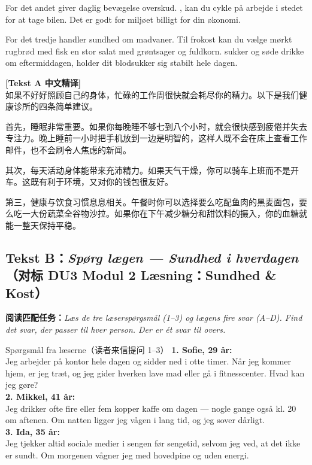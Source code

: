 For det andet giver daglig bevægelse overskud. , kan du cykle på arbejde i stedet for at tage bilen. Det er  godt for miljøet  billigt for din økonomi.

For det tredje handler sundhed om madvaner. Til frokost kan du vælge  mørkt rugbrød med fisk  en stor salat med grøntsager og fuldkorn.  sukker og søde drikke om eftermiddagen, holder dit blodsukker sig stabilt hele dagen.

\begin{transbox}
\small
\textbf{\color{NCDTeal}[Tekst A 中文精译]}\\
如果不好好照顾自己的身体，忙碌的工作周很快就会耗尽你的精力。以下是我们健康诊所的四条简单建议。

首先，睡眠非常重要。如果你每晚睡不够七到八个小时，就会很快感到疲倦并失去专注力。晚上睡前一小时把手机放到一边是明智的，这样人既不会在床上查看工作邮件，也不会刷令人焦虑的新闻。

其次，每天活动身体能带来充沛精力。如果天气干燥，你可以骑车上班而不是开车。这既有利于环境，又对你的钱包很友好。

第三，健康与饮食习惯息息相关。午餐时你可以选择要么吃配鱼肉的黑麦面包，要么吃一大份蔬菜全谷物沙拉。如果你在下午减少糖分和甜饮料的摄入，你的血糖就能一整天保持平稳。
\end{transbox}

\subsection*{Tekst B：\textit{Spørg lægen --- Sundhed i hverdagen}（对标 DU3 Modul 2 Læsning：Sundhed \& Kost）}

\textbf{阅读匹配任务：}\textit{Læs de tre læserspørgsmål (1--3) og lægens fire svar (A--D). Find det svar, der passer til hver person. Der er ét svar til overs.}

\vspace{0.3em}
\begin{emailbox}{Spørgsmål fra læserne（读者来信提问 1--3）}
\textbf{1. Sofie, 29 år:}\\
Jeg arbejder på kontor hele dagen og sidder ned i otte timer. Når jeg kommer hjem, er jeg træt, og jeg gider hverken lave mad eller gå i fitnesscenter. Hvad kan jeg gøre?\\[4pt]
\textbf{2. Mikkel, 41 år:}\\
Jeg drikker ofte fire eller fem kopper kaffe om dagen --- nogle gange også kl. 20 om aftenen. Om natten ligger jeg vågen i lang tid, og jeg sover dårligt.\\[4pt]
\textbf{3. Ida, 35 år:}\\
Jeg tjekker altid sociale medier i sengen før sengetid, selvom jeg ved, at det ikke er sundt. Om morgenen vågner jeg med hovedpine og uden energi.
\end{emailbox}

